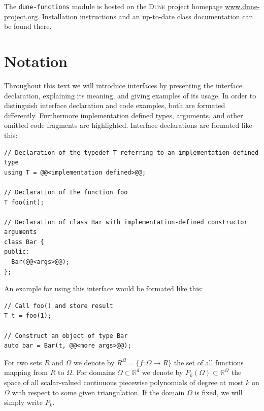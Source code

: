 \documentclass[a4paper,10pt,headings=normal,bibliography=totoc]{scrartcl}
\newcommand{\R}{\mathbb{R}}
\newcommand{\dune}{\textsc{Dune}\xspace}
\newcommand{\dunemodule}[1]{\texttt{#1}}
\begin{document}
The \dunemodule{dune-functions} module is hosted on the \dune project homepage \url{www.dune-project.org}.
Installation instructions and an up-to-date class documentation can be found there.

\setcounter{tocdepth}{2}  %
\tableofcontents


\section*{Notation}
Throughout this text we will introduce interfaces
by presenting the interface declaration, explaining
its meaning, and giving examples of its usage.
In order to distinguish interface declaration
and code examples, both are formated differently.
Furthermore implementation defined types, arguments,
and other omitted code fragments are highlighted.
Interface declarations are formated like this:
\begin{lstlisting}[style=Interface]
// Declaration of the typedef T referring to an implementation-defined type
using T = @@<implementation defined>@@;

// Declaration of the function foo
T foo(int);

// Declaration of class Bar with implementation-defined constructor arguments
class Bar {
public:
  Bar(@@<args>@@);
};
\end{lstlisting}
An example for using this interface would be formated like this:
\begin{lstlisting}[style=Example]
// Call foo() and store result
T t = foo(1);

// Construct an object of type Bar
auto bar = Bar(t, @@<more args>@@);
\end{lstlisting}

For two sets $R$ and $\Omega$ we denote by $R^\Omega = \{f:\Omega \to R\}$
the set of all functions mapping from $R$ to $\Omega$. For domains $\Omega\subset \R^d$
we denote by $P_k(\Omega) \subset \R^\Omega$ the space of all
scalar-valued continuous piecewise polynomials of degree at most $k$ on $\Omega$
with respect to some given triangulation.
If the domain $\Omega$ is fixed, we will simply write $P_k$.
\end{document}
